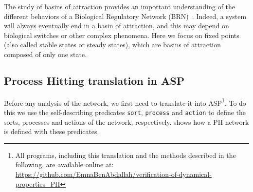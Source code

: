 The study of basins of attraction provides an important understanding of the different behaviors of a Biological Regulatory Network (BRN)~\cite{wuensche1998genomic}.
Indeed, a system will always eventually end in a basin of attraction,
and this may depend on biological switches or other complex phenomena.
Here we focus on fixed points (also called stable states or steady states),
which are basins of attraction composed of only one state.

\subsection{Process Hitting translation in ASP}
Before any analysis of the network,
we first need to translate it into ASP\footnote{All programs, including this translation and the methods described in the following, are available online at: \url{https://github.com/EmnaBenAbdallah/verification-of-dynamical-properties_PH}}.
To do this we use the self-describing predicates
\texttt{sort}, \texttt{process} and \texttt{action} to define the sorts, processes and actions of the network, respectively.
 shows how a PH network is defined with these predicates.


